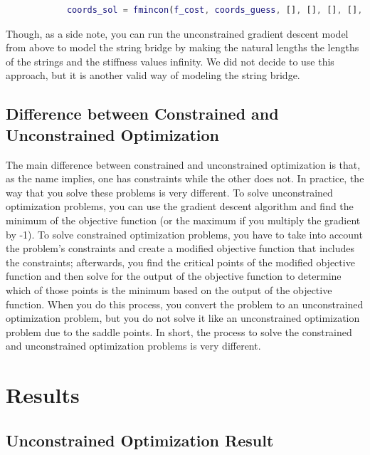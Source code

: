 \documentclass[10pt,letterpaper,onecolumn,report]{tau-class/tau}
\begin{document}
        \begin{lstlisting}[language=Matlab, caption=Using fmincon to compute the most optimal point from our modified objective function (taking into account the constraints).]
            % use fmincon to compute the predicted vertex locations
            coords_sol = fmincon(f_cost, coords_guess, [], [], [], [], [], [], f_cstr);
        \end{lstlisting}

        Though, as a side note, you can run the unconstrained gradient descent model from above to model the string bridge by making the natural lengths the lengths of the strings and the stiffness values infinity. We did not decide to use this approach, but it is another valid way of modeling the string bridge.

    \subsection{Difference between Constrained and Unconstrained Optimization}

        The main difference between constrained and unconstrained optimization is that, as the name implies, one has constraints while the other does not. In practice, the way that you solve these problems is very different. To solve unconstrained optimization problems, you can use the gradient descent algorithm and find the minimum of the objective function (or the maximum if you multiply the gradient by -1). To solve constrained optimization problems, you have to take into account the problem’s constraints and create a modified objective function that includes the constraints; afterwards, you find the critical points of the modified objective function and then solve for the output of the objective function to determine which of those points is the minimum based on the output of the objective function. When you do this process, you convert the problem to an unconstrained optimization problem, but you do not solve it like an unconstrained optimization problem due to the saddle points. In short, the process to solve the constrained and unconstrained optimization problems is very different.
        
\section{Results}
    \subsection{Unconstrained Optimization Result}
    
\end{document}
